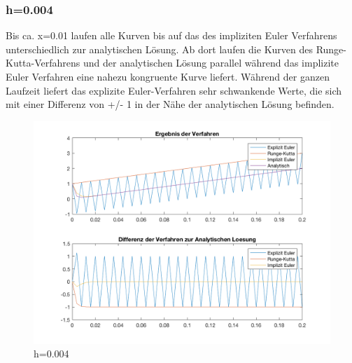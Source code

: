 \documentclass[]{scrartcl}
\begin{document}
\subsubsection{h=0.004}
Bis ca. x=0.01 laufen alle Kurven bis auf das des impliziten Euler Verfahrens unterschiedlich zur analytischen Lösung. Ab dort laufen die Kurven des Runge-Kutta-Verfahrens und der analytischen Lösung parallel während das implizite Euler Verfahren eine nahezu kongruente Kurve liefert. Während der ganzen Laufzeit liefert das explizite Euler-Verfahren sehr schwankende Werte, die sich mit einer Differenz von +/- 1 in der Nähe der analytischen Lösung befinden.
\begin{figure}[htbp]
	\centering
	\includegraphics[width=1\linewidth]{a1_1_3}
	\caption{h=0.004}
	\label{fig:a1_1_3}
\end{figure}
\end{document}
